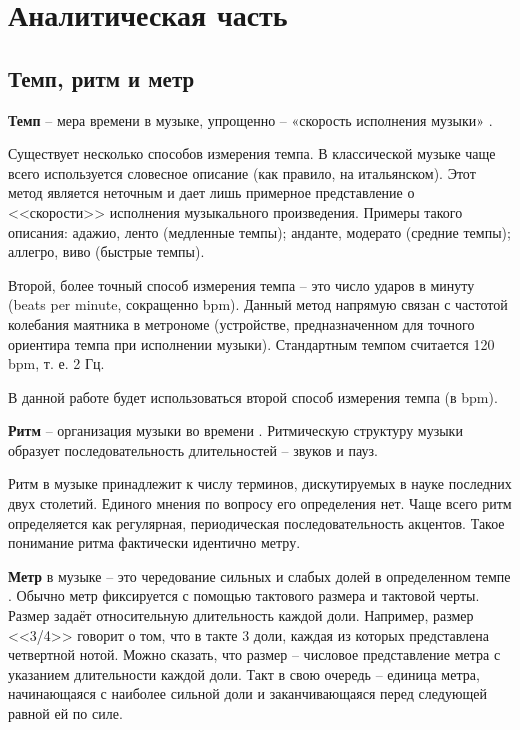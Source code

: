 \section{Аналитическая часть}

\subsection{Темп, ритм и метр}

\textbf{Темп} -- мера времени в музыке, упрощенно -- «скорость исполнения музыки» \cite{grouv}.

Существует несколько способов измерения темпа. В классической музыке чаще всего используется словесное описание (как правило, на итальянском). Этот метод является неточным и дает лишь примерное представление о <<скорости>> исполнения музыкального произведения. Примеры такого описания: адажио, ленто (медленные темпы); анданте, модерато (средние темпы); аллегро, виво (быстрые темпы).

Второй, более точный способ измерения темпа -- это число ударов в минуту (beats per minute, сокращенно bpm). Данный метод напрямую связан с частотой колебания маятника в метрономе (устройстве, предназначенном для точного ориентира темпа при исполнении музыки). Стандартным темпом считается 120 bpm, т. е. 2 Гц.

В данной работе будет использоваться второй способ измерения темпа (в bpm).

\textbf{Ритм} -- организация музыки во времени \cite{chehovich}. Ритмическую структуру музыки образует последовательность длительностей -- звуков и пауз.

Ритм в музыке принадлежит к числу терминов, дискутируемых в науке последних двух столетий. Единого мнения по вопросу его определения нет. Чаще всего ритм определяется как регулярная, периодическая последовательность акцентов. Такое понимание ритма фактически идентично метру.

\textbf{Метр} в музыке -- это чередование сильных и слабых долей в определенном темпе \cite{grouv}. Обычно метр фиксируется с помощью тактового размера и тактовой черты. Размер задаёт относительную длительность каждой доли. Например, размер <<3/4>> говорит о том, что в такте 3 доли, каждая из которых представлена четвертной нотой. Можно сказать, что размер -- числовое представление метра с указанием длительности каждой доли. Такт в свою очередь -- единица метра, начинающаяся с наиболее сильной доли и заканчивающаяся перед следующей равной ей по силе.

